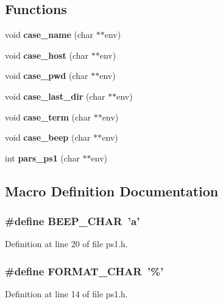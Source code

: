 \subsection*{Functions}
\begin{DoxyCompactItemize}
\item 
void {\bf case\-\_\-name} (char $\ast$$\ast$env)
\item 
void {\bf case\-\_\-host} (char $\ast$$\ast$env)
\item 
void {\bf case\-\_\-pwd} (char $\ast$$\ast$env)
\item 
void {\bf case\-\_\-last\-\_\-dir} (char $\ast$$\ast$env)
\item 
void {\bf case\-\_\-term} (char $\ast$$\ast$env)
\item 
void {\bf case\-\_\-beep} (char $\ast$$\ast$env)
\item 
int {\bf pars\-\_\-ps1} (char $\ast$$\ast$env)
\end{DoxyCompactItemize}


\subsection{Macro Definition Documentation}
\subsubsection[{B\-E\-E\-P\-\_\-\-C\-H\-A\-R}]{\setlength{\rightskip}{0pt plus 5cm}\#define B\-E\-E\-P\-\_\-\-C\-H\-A\-R~'a'}\label{ps1_8h_a512e1f1ad550cb7f0e0fe02741113c6e}


Definition at line 20 of file ps1.\-h.

\subsubsection[{F\-O\-R\-M\-A\-T\-\_\-\-C\-H\-A\-R}]{\setlength{\rightskip}{0pt plus 5cm}\#define F\-O\-R\-M\-A\-T\-\_\-\-C\-H\-A\-R~'\%'}\label{ps1_8h_aeb7fb1d98bb972105415bef946116d47}


Definition at line 14 of file ps1.\-h.

